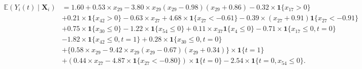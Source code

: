 \documentclass[USenglish,onecolumn]{article}
\newcommand\E{\mathbb{E}}
\newcommand\bX{\bm{X}}
\newcommand\bone{\mathbf{1}}
\begin{document}
\begin{align*}
  \E(Y_i(t) \mid \bX_i) &= 1.60+ 0.53\times
    x_{29}-3.80\times x_{29}(x_{29}-0.98)(x_{29}+0.86) -0.32 \times
    \bone\{x_{17}>0\}\\& + 0.21 \times \bone\{x_{42}>0\}-0.63 \times
    x_{27}+4.68 \times \bone\{x_{27}<-0.61\}-0.39 \times (x_{27}+0.91)
    \bone\{x_{27}<-0.91\}\\&+ 0.75 \times \bone\{x_{30}\leq0\}-1.22
    \times \bone\{x_{54}\leq0\}+0.11 \times x_{37}
    \bone\{x_{4}\leq0\}-0.71 \times \bone\{x_{17}\leq0, t=0\}\\&-1.82
    \times \bone\{x_{42}\leq 0,t=1\}+0.28 \times \bone\{x_{30}\leq
    0,t=0\}\\&+\{0.58\times x_{29}-9.42 \times
    x_{29}(x_{29}-0.67)(x_{29}+0.34)\}\times\bone\{t=1\}\\&+(0.44
    \times x_{27}-4.87\times
    \bone\{x_{27}<-0.80\})\times\bone\{t=0\}-2.54 \times \bone\{t=0,
    x_{54}\leq 0\}.
\end{align*}
\end{document}
